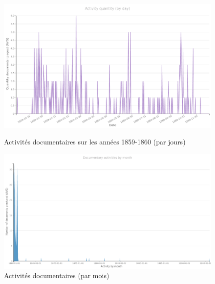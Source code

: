 \begin{figure}
    \centering
    \includegraphics[width = 1\textwidth]{annexes/graph/activity_quantity_day.png}
    \caption{Activités documentaires sur les années 1859-1860 (par jours)}
    \label{fig:day_activities}
    \includegraphics[width = 1\textwidth]{annexes/graph/archives_activity_month.png}
    \caption{Activités documentaires (par mois)}
    \label{fig:month_activities}
\end{figure}


